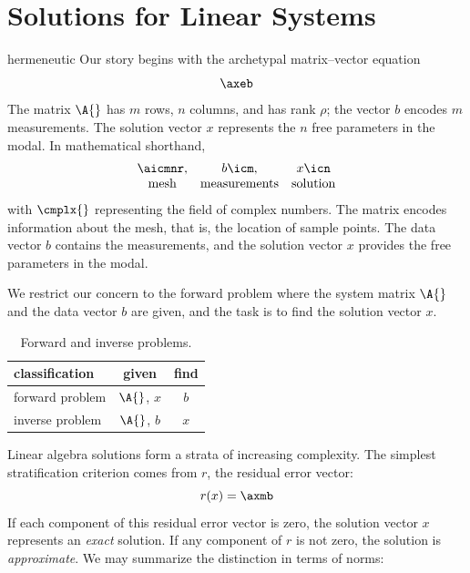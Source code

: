\section{Solutions for Linear Systems}
hermeneutic
Our story begins with the archetypal  matrix--vector equation
%
\begin{equation}
	\axeb 
\label{eq:axeb}
\end{equation}
%
The matrix $\A{}$ has $m$ rows, $n$ columns, and has rank $\rho$; the vector $b$ encodes $m$ measurements. The solution vector $x$ represents the $n$ free parameters in the modal. In mathematical shorthand,
%
%
\begin{equation}
	\begin{array}{ccc}
		\aicmnr, & b \icm,& x \icn \\
		\text{mesh} & \text{measurements} & \text{solution}
	\end{array}
\end{equation}
% 
with $\cmplx{}$ representing the field of complex numbers. The matrix encodes information about the mesh, that is, the location of sample points. The data vector $b$ contains the measurements, and the solution vector $x$ provides the free parameters in the modal.

We restrict our concern to the forward problem where the system matrix $\A{}$ and the data vector $b$ are given, and the task is to find the solution vector $x$.
%
\begin{table}[htp]
	\caption{Forward and inverse problems.}
	\begin{center}
		\begin{tabular}{lcc}
			classification & given & find \\\hline
			forward problem & $\A{}$, $x$ & $b$ \\
			inverse problem & $\A{}$, $b$ & $x$
		\end{tabular}
	\end{center}
\label{tab:problem types}
\end{table}%
%

Linear algebra solutions form a strata of increasing complexity. The simplest stratification criterion comes from $r$, the residual error vector:
%
\begin{equation*}
	r(x) = \axmb
\end{equation*}
%
If each component of this residual error vector is zero, the solution vector $x$ represents an \textit{exact} solution. If any component of $r$ is not zero, the solution is \textit{approximate}. We may summarize the distinction in terms of norms:

